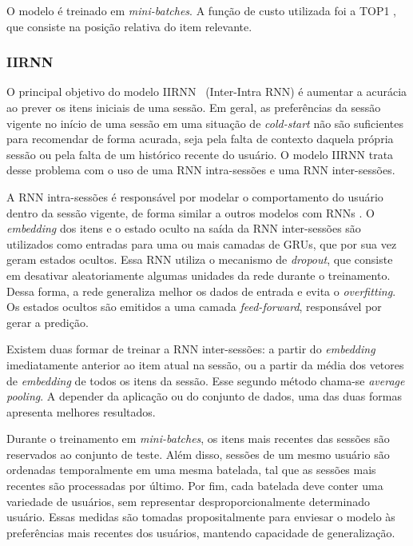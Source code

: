 O modelo é treinado em \textit{mini-batches}. A função de custo utilizada foi a
  TOP1 \cite{HidasiKBT15}, que consiste na posição relativa do item relevante.

\subsubsection{IIRNN}
  O principal objetivo do modelo IIRNN~\cite{skrede2017inter} (Inter-Intra RNN) é aumentar a acurácia
ao prever os itens iniciais de uma sessão. Em geral, as preferências da sessão
vigente no início de uma sessão em uma situação de \textit{cold-start} não são
suficientes para recomendar de forma acurada, seja pela falta de contexto
daquela própria sessão ou pela falta de um histórico recente do usuário. O
modelo IIRNN trata desse problema com o uso de uma RNN intra-sessões e uma RNN
inter-sessões.

A RNN intra-sessões é responsável por modelar o comportamento do usuário dentro
da sessão vigente, de forma similar a outros modelos com RNNs
\cite{HidasiKBT15}. O \textit{embedding} dos itens e o estado oculto na saída da
RNN inter-sessões são utilizados como entradas para uma ou mais camadas de GRUs,
que por sua vez geram estados ocultos. Essa RNN utiliza o mecanismo de
\textit{dropout}, que consiste em desativar aleatoriamente algumas unidades da
rede durante o treinamento. Dessa forma, a rede generaliza melhor os dados de
entrada e evita o \textit{overfitting}. Os estados ocultos são emitidos a uma camada
\textit{feed-forward}, responsável por gerar a predição.

Existem duas formar de treinar a RNN inter-sessões: a partir do
\textit{embedding} imediatamente anterior ao item atual na sessão, ou a partir
da média dos vetores de \textit{embedding} de todos os itens da sessão. Esse
segundo método chama-se \textit{average pooling}. A depender da aplicação ou do
conjunto de dados, uma das duas formas apresenta melhores resultados.

Durante o treinamento em \textit{mini-batches}, os itens mais recentes das
sessões são reservados ao conjunto de teste. Além disso, sessões de um mesmo
usuário são ordenadas temporalmente em uma mesma batelada, tal que as
sessões mais recentes são processadas por último. Por fim, cada batelada
deve conter uma variedade de usuários, sem representar desproporcionalmente
determinado usuário. Essas medidas são tomadas propositalmente para enviesar o
modelo às preferências mais recentes dos usuários, mantendo capacidade de
generalização. 

